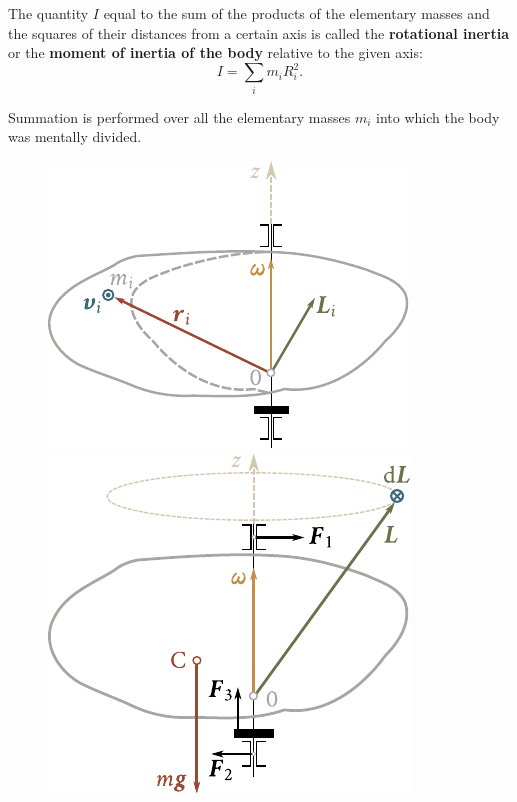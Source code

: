 \noindent
The quantity $I$ equal to the sum of the products of the elementary masses and the squares of their distances from a certain axis is called the \textbf{rotational inertia} or the \textbf{moment of inertia of the body} relative to the given axis:
\begin{equation}\label{eq:5_11}
I = \sum_i m_i R_i^2.
\end{equation}

\noindent
Summation is performed over all the elementary masses $m_i$ into which the body was mentally divided.

\begin{figure}[t]
	\begin{minipage}[t]{0.5\linewidth}
		\begin{center}
			\includegraphics[scale=0.95]{figures/ch_05/fig_5_6.pdf}
			\caption[]{}
			\label{fig:5_6}
		\end{center}
	\end{minipage}
	\hspace{-0.05cm}
	\begin{minipage}[t]{0.5\linewidth}
		\begin{center}
			\includegraphics[scale=0.95]{figures/ch_05/fig_5_7.pdf}
			\caption[]{}
			\label{fig:5_7}
		\end{center}
	\end{minipage}
\vspace{-0.7cm}
\end{figure}

